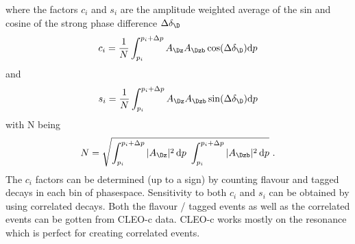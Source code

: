 where the factors $c_i$ and $s_i$ are the amplitude weighted average of the sin and cosine of the \D strong phase difference $\Delta \delta_{\D}$
\begin{equation}
c_i = \frac{1}{N} \int_{p_i}^{p_i + \Delta p} A_{\Dz} A_{\Dzb} \cos(\Delta \delta_{\D}) \mathrm{d}p
\end{equation}
and
\begin{equation}
s_i = \frac{1}{N} \int_{p_i}^{p_i + \Delta p} A_{\Dz} A_{\Dzb} \sin(\Delta \delta_{\D}) \mathrm{d}p
\end{equation}
with N being 
\begin{equation}
N = \sqrt{\int_{p_i}^{p_i + \Delta p} |A_{\Dz}|^2 \, \mathrm{d}p \ \int_{p_i}^{p_i + \Delta p} |A_{\Dzb}|^2 \, \mathrm{d}p} \ .
\end{equation}
The $c_i$ factors can be determined (up to a sign) by counting flavour and \CP tagged \D decays in each bin of phasespace. Sensitivity to both $c_i$ and $s_i$ can be obtained by using correlated \D decays. Both the flavour / \CP tagged events as well as the correlated events can be gotten from CLEO-c data. CLEO-c works mostly on the \psiprpr resonance which is perfect for creating correlated \D events.\\



